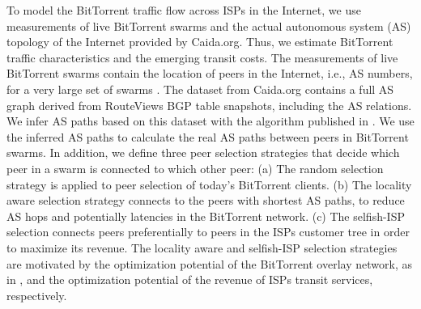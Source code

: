 To model the BitTorrent traffic flow across ISPs in the Internet, we use measurements of live BitTorrent swarms and the actual autonomous system (AS) topology of the Internet provided by Caida.org. Thus, we estimate BitTorrent traffic characteristics and the emerging transit costs.
The measurements of live BitTorrent swarms contain the location of peers in the Internet, i.e., AS numbers, for a very large set of swarms \cite{Hossfeld2011}.
The dataset from Caida.org contains a full AS graph derived from RouteViews BGP table snapshots, including the AS relations. We infer AS paths based on this dataset with the algorithm published in \cite{yang2009efficient}.
We use the inferred AS paths to calculate the real AS paths between peers in BitTorrent swarms. In addition, we define three peer selection strategies that decide which peer in a swarm is connected to which other peer: (a) The random selection strategy is applied to peer selection of today's BitTorrent clients. (b) The locality aware selection strategy connects to the peers with shortest AS paths, to reduce AS hops and potentially latencies in the BitTorrent network. (c) The selfish-ISP selection connects peers preferentially to peers in the ISPs customer tree in order to maximize its revenue. The locality aware and selfish-ISP selection strategies are motivated by the optimization potential of the BitTorrent overlay network, as in \cite{Hossfeld2011}, and the optimization potential of the revenue of ISPs transit services, respectively.

